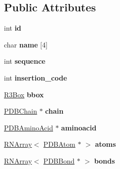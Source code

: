 \subsection*{Public Attributes}
\begin{DoxyCompactItemize}
\item 
int {\bfseries id}\hypertarget{class_p_d_b_residue_a408d4d8c24b6702a411a41c5d5d950a4}{}\label{class_p_d_b_residue_a408d4d8c24b6702a411a41c5d5d950a4}

\item 
char {\bfseries name} \mbox{[}4\mbox{]}\hypertarget{class_p_d_b_residue_a571c7cee54b5d577bc9f0c64c7ad14af}{}\label{class_p_d_b_residue_a571c7cee54b5d577bc9f0c64c7ad14af}

\item 
int {\bfseries sequence}\hypertarget{class_p_d_b_residue_ae2ee5c8048b498d31f629f2bcb42ca84}{}\label{class_p_d_b_residue_ae2ee5c8048b498d31f629f2bcb42ca84}

\item 
int {\bfseries insertion\+\_\+code}\hypertarget{class_p_d_b_residue_af5dd5a445c04b10a8eee7cd944bc3593}{}\label{class_p_d_b_residue_af5dd5a445c04b10a8eee7cd944bc3593}

\item 
\hyperlink{class_r3_box}{R3\+Box} {\bfseries bbox}\hypertarget{class_p_d_b_residue_a70b3eae8032e102b5293078fb81d76de}{}\label{class_p_d_b_residue_a70b3eae8032e102b5293078fb81d76de}

\item 
\hyperlink{class_p_d_b_chain}{P\+D\+B\+Chain} $\ast$ {\bfseries chain}\hypertarget{class_p_d_b_residue_ac7e10466ba5c43a9a0934c5c5393e05b}{}\label{class_p_d_b_residue_ac7e10466ba5c43a9a0934c5c5393e05b}

\item 
\hyperlink{class_p_d_b_amino_acid}{P\+D\+B\+Amino\+Acid} $\ast$ {\bfseries aminoacid}\hypertarget{class_p_d_b_residue_a57eda1633159b23a4e0a62950dfbcea7}{}\label{class_p_d_b_residue_a57eda1633159b23a4e0a62950dfbcea7}

\item 
\hyperlink{class_r_n_array}{R\+N\+Array}$<$ \hyperlink{class_p_d_b_atom}{P\+D\+B\+Atom} $\ast$ $>$ {\bfseries atoms}\hypertarget{class_p_d_b_residue_abd90473146df2b0eeb9d529afaf54e9f}{}\label{class_p_d_b_residue_abd90473146df2b0eeb9d529afaf54e9f}

\item 
\hyperlink{class_r_n_array}{R\+N\+Array}$<$ \hyperlink{class_p_d_b_bond}{P\+D\+B\+Bond} $\ast$ $>$ {\bfseries bonds}\hypertarget{class_p_d_b_residue_a48cd867e021036fe0694f135bd1d51b0}{}\label{class_p_d_b_residue_a48cd867e021036fe0694f135bd1d51b0}


\end{DoxyCompactItemize}

